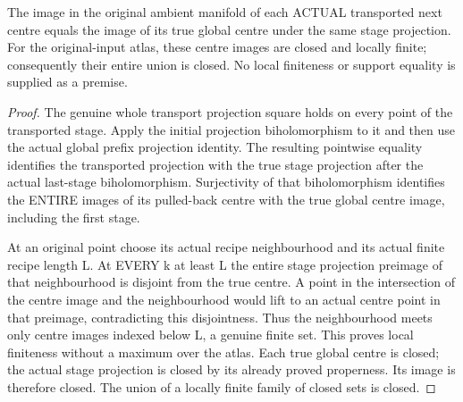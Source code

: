 \begin{theorem}
\label{hir:sharp-actual-curve-growing-centre-images-locally-finite}
\leanok
The image in the original ambient manifold of each ACTUAL transported next
centre equals the image of its true global centre under the same stage
projection. For the original-input atlas, these centre images are closed
and locally finite; consequently their entire union is closed. No local
finiteness or support equality is supplied as a premise.
\end{theorem}
\begin{proof}
The genuine whole transport projection square holds on every point of the
transported stage. Apply the initial projection biholomorphism to it and
then use the actual global prefix projection identity. The resulting
pointwise equality identifies the transported projection with the true
stage projection after the actual last-stage biholomorphism. Surjectivity
of that biholomorphism identifies the ENTIRE images of its pulled-back
centre with the true global centre image, including the first stage.

At an original point choose its actual recipe neighbourhood and its actual
finite recipe length L. At EVERY k at least L the entire stage projection
preimage of that neighbourhood is disjoint from the true centre. A point
in the intersection of the centre image and the neighbourhood would lift
to an actual centre point in that preimage, contradicting this disjointness.
Thus the neighbourhood meets only centre images indexed below L, a genuine
finite set. This proves local finiteness without a maximum over the atlas.
Each true global centre is closed; the actual stage projection is closed
by its already proved properness. Its image is therefore closed. The union
of a locally finite family of closed sets is closed.
\end{proof}

